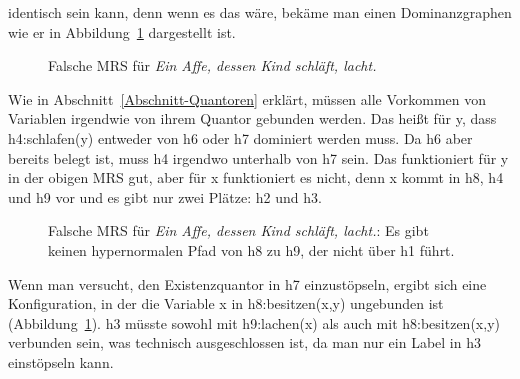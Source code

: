 identisch sein kann, denn wenn es das wäre, bekäme man einen Dominanzgraphen wie er in Abbildung~\ref{Abbildung dessen Kind-falsch}
dargestellt ist.
\begin{figure}

\caption{Falsche MRS für \emph{Ein Affe, dessen Kind schläft, lacht.}}\label{Abbildung dessen Kind-falsch}
\end{figure}

Wie in Abschnitt~\ref{Abschnitt-Quantoren} erklärt, müssen alle Vorkommen von Variablen irgendwie von
ihrem Quantor gebunden werden. Das heißt für y, dass h4:schlafen(y) entweder von h6 oder h7 dominiert
werden muss. Da h6 aber bereits belegt ist, muss h4 irgendwo unterhalb von h7 sein. Das funktioniert
für y in der obigen MRS gut, aber für x funktioniert es nicht, denn x kommt in h8, h4 und h9 vor und
es gibt nur zwei Plätze: h2 und h3.
\begin{figure}
\caption{Falsche MRS für \emph{Ein Affe, dessen Kind schläft, lacht.}: Es gibt keinen hypernormalen
  Pfad von h8 zu h9, der nicht über h1 führt.}\label{Abbildung dessen Kind-falsche-MRS}
\end{figure}
Wenn man versucht, den Existenzquantor in h7 einzustöpseln, ergibt sich eine Konfiguration, in der
die Variable x in h8:besitzen(x,y) ungebunden ist (Abbildung~\ref{Abbildung dessen Kind-falsch}). h3 müsste sowohl mit h9:lachen(x) als auch mit
h8:besitzen(x,y) verbunden sein, was technisch ausgeschlossen ist, da man nur ein Label in h3
einstöpseln kann.

